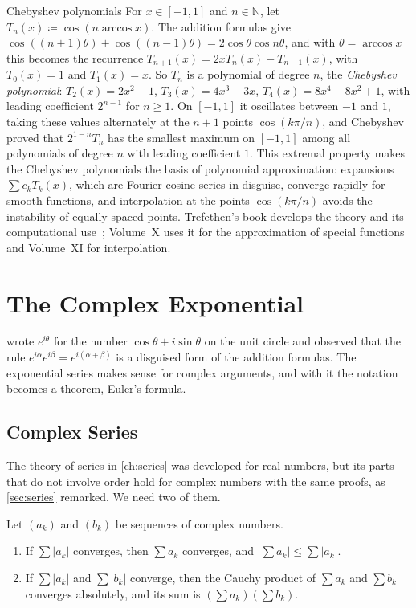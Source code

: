 \begin{note}{Chebyshev polynomials}
For $x\in[-1,1]$ and $n\in\mathbb N$, let $T_n(x)\coloneqq\cos(n\arccos x)$. The addition formulas give $\cos((n+1)\theta)+\cos((n-1)\theta)=2\cos\theta\cos n\theta$, and with $\theta=\arccos x$ this becomes the recurrence $T_{n+1}(x)=2xT_n(x)-T_{n-1}(x)$, with $T_0(x)=1$ and $T_1(x)=x$. So $T_n$ is a polynomial of degree $n$, the \emph{Chebyshev polynomial}: $T_2(x)=2x^2-1$, $T_3(x)=4x^3-3x$, $T_4(x)=8x^4-8x^2+1$, with leading coefficient $2^{n-1}$ for $n\ge1$. On $[-1,1]$ it oscillates between $-1$ and $1$, taking these values alternately at the $n+1$ points $\cos(k\pi/n)$, and Chebyshev proved that $2^{1-n}T_n$ has the smallest maximum on $[-1,1]$ among all polynomials of degree $n$ with leading coefficient $1$. This extremal property makes the Chebyshev polynomials the basis of polynomial approximation: expansions $\sum c_kT_k(x)$, which are Fourier cosine series in disguise, converge rapidly for smooth functions, and interpolation at the points $\cos(k\pi/n)$ avoids the instability of equally spaced points. Trefethen's book develops the theory and its computational use~\cite{trefethen2013atap}; Volume~X uses it for the approximation of special functions and Volume~XI for interpolation.
\end{note}

\section{The Complex Exponential}
\label{sec:complex-exp}

 wrote $e^{i\theta}$ for the number $\cos\theta+i\sin\theta$ on the unit circle and observed that the rule $e^{i\alpha}e^{i\beta}=e^{i(\alpha+\beta)}$ is a disguised form of the addition formulas. The exponential series makes sense for complex arguments, and with it the notation becomes a theorem, Euler's formula.

\subsection{Complex Series}

The theory of series in \cref{ch:series} was developed for real numbers, but its parts that do not involve order hold for complex numbers with the same proofs, as \cref{sec:series} remarked. We need two of them.

\begin{lemma}
\label{lem:complex-series}
Let $(a_k)$ and $(b_k)$ be sequences of complex numbers.
\begin{enumerate}
\item If $\sum|a_k|$ converges, then $\sum a_k$ converges, and $|\sum a_k|\le\sum|a_k|$.
\item If $\sum|a_k|$ and $\sum|b_k|$ converge, then the Cauchy product of $\sum a_k$ and $\sum b_k$ converges absolutely, and its sum is $(\sum a_k)(\sum b_k)$.
\end{enumerate}
\end{lemma}

